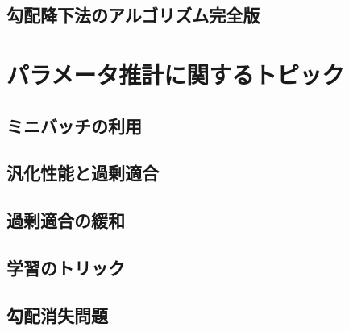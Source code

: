 \documentclass[a4paper,10pt]{jsarticle}
\theoremstyle{definition}
\begin{document}
%
\subsection{勾配降下法のアルゴリズム完全版}

\section{パラメータ推計に関するトピック}
%
\subsection{ミニバッチの利用}
%
\subsection{汎化性能と過剰適合}
%
\subsection{過剰適合の緩和}
%
\subsection{学習のトリック}
%
\subsection{勾配消失問題}
\end{document}
